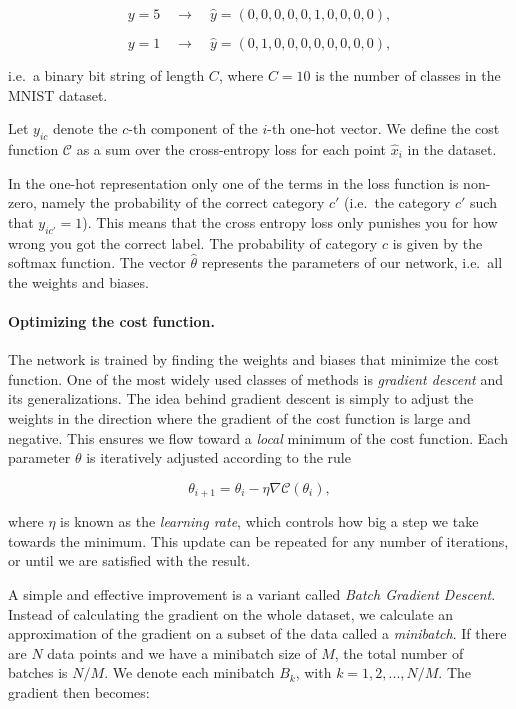 $$ y = 5 \quad \rightarrow \quad \hat{y} = (0, 0, 0, 0, 0, 1, 0, 0, 0, 0) ,$$  

$$ y = 1 \quad \rightarrow \quad \hat{y} = (0, 1, 0, 0, 0, 0, 0, 0, 0, 0) ,$$  


i.e.~a binary bit string of length $C$, where $C = 10$ is the number of classes in the MNIST dataset.  

Let $y_{ic}$ denote the $c$-th component of the $i$-th one-hot vector.  
We define the cost function $\mathcal{C}$ as a sum over the cross-entropy loss for each point $\hat{x}_i$ in the dataset.

In the one-hot representation only one of the terms in the loss function is non-zero, namely the
probability of the correct category $c'$  
(i.e.~the category $c'$ such that $y_{ic'} = 1$). This means that the cross entropy loss only punishes you for how wrong
you got the correct label. The probability of category $c$ is given by the softmax function. The vector $\hat{\theta}$ represents the parameters of our network, i.e.~all the weights and biases.  



\paragraph{Optimizing the cost function.}
The network is trained by finding the weights and biases that minimize the cost function. One of the most widely used classes of methods is \emph{gradient descent} and its generalizations. The idea behind gradient descent
is simply to adjust the weights in the direction where the gradient of the cost function is large and negative. This ensures we flow toward a \emph{local} minimum of the cost function.  
Each parameter $\theta$ is iteratively adjusted according to the rule  

$$ \theta_{i+1} = \theta_i - \eta \nabla \mathcal{C}(\theta_i) ,$$

where $\eta$ is known as the \emph{learning rate}, which controls how big a step we take towards the minimum.  
This update can be repeated for any number of iterations, or until we are satisfied with the result.  

A simple and effective improvement is a variant called \emph{Batch Gradient Descent}.  
Instead of calculating the gradient on the whole dataset, we calculate an approximation of the gradient
on a subset of the data called a \emph{minibatch}.  
If there are $N$ data points and we have a minibatch size of $M$, the total number of batches
is $N/M$.  
We denote each minibatch $B_k$, with $k = 1, 2,...,N/M$. The gradient then becomes:  

